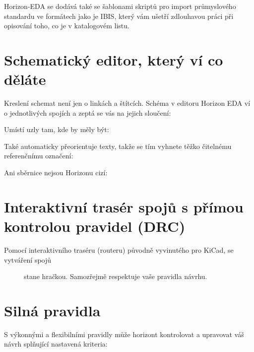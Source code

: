 \documentclass[letterpaper,10pt,czech]{sphinxmanual}
\begin{document}
\noindent{}

Horizon-EDA se dodává také se šablonami skriptů pro import průmyslového standardu
ve formátech jako je IBIS, který vám ušetří zdlouhavou práci při opisování toho, co je v katalogovém listu.


\section{Schematický editor, který ví co děláte}
\label{\detokenize{feature-overview:schematicky-editor-ktery-vi-co-delate}}
Kreslení schemat není jen o linkách a štítcích. Schéma v editoru Horizon EDA
ví o jednotlivých spojích a zeptá se vás na jejich sloučení:

\noindent{}

Umístí uzly tam, kde by měly být:

\noindent{}

Také automaticky přeorientuje texty, takže se tím vyhnete
těžko čitelnému referenčnímu označení:

\noindent{}

Ani sběrnice nejsou Horizonu cizí:

\noindent{}


\section{Interaktivní trasér spojů s přímou kontrolou pravidel (DRC)}
\label{\detokenize{feature-overview:interaktivni-traser-spoju-s-primou-kontrolou-pravidel-drc}}\begin{description}
\item[{Pomocí interaktivního traséru (routeru) původně vyvinutého pro KiCad, se vytváření spojů}] \leavevmode
stane hračkou. Samozřejmě respektuje vaše pravidla návrhu.

\end{description}

\noindent{}


\section{Silná pravidla}
\label{\detokenize{feature-overview:silna-pravidla}}
S výkonnými a flexibilními pravidly může horizont kontrolovat a upravovat váš
návrh splňující nastavená kriteria:
\end{document}
